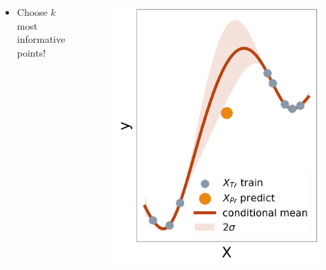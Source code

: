 \documentclass{beamer}                             %
\begin{document}
\begin{frame}
\begin{columns}
\begin{column}{0.6\textwidth}
\begin{itemize}
        \item<+-> Choose \( k \) most informative points!
      \end{itemize}
    \end{column}
    \begin{column}{0.4\textwidth}
      \begin{figure}
        \centering
        \includegraphics[width=\textwidth]{graphs/predict_all}
      \end{figure}
    \end{column}
  \end{columns}
\end{frame}
\end{document}
